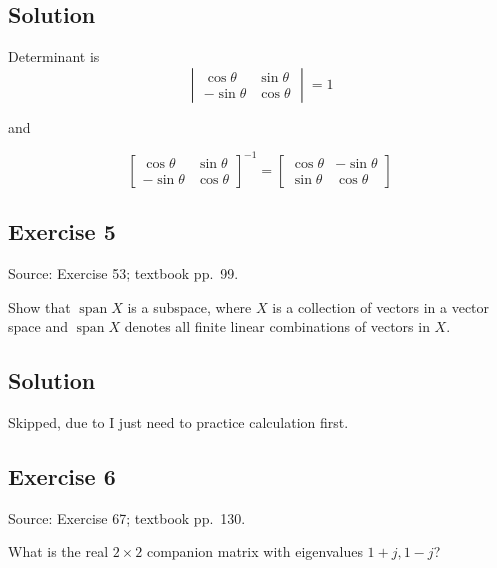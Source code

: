 \documentclass[12pt,a4paper]{article}
\newlength{\questionroom}
\newenvironment{questionprompt}{%
  \begin{lrbox}{\questionbox}\begin{minipage}{\linewidth}%
}{%
  \end{minipage}\end{lrbox}%
  \setlength{\questionroom}{\dimexpr\ht\questionbox+\dp\questionbox+5.2cm\relax}%
  \ifdim\questionroom>\textheight\setlength{\questionroom}{\textheight}\fi
  \Needspace{\questionroom}%
  \noindent\usebox{\questionbox}\par
}
\begin{document}
\subsection*{Solution}

Determinant is 
\[
\begin{vmatrix}
	\cos \theta & \sin\theta\\-\sin\theta & \cos\theta
\end{vmatrix} = 1
\]

and

\[
\begin{bmatrix}\cos\theta&\sin\theta\\-\sin\theta&\cos\theta\end{bmatrix}^{-1} =\begin{bmatrix}\cos\theta&-\sin\theta\\ \sin\theta&\cos\theta\end{bmatrix}
\]

\vspace{3.5cm}


\begin{questionprompt}
\section*{Exercise 5}
\label{practice:5}
{\small Source: Exercise 53; textbook pp.~99.}\par
Show that $\operatorname{span}X$ is a subspace, where $X$ is a collection of vectors in a vector space and $\operatorname{span}X$ denotes all finite linear combinations of vectors in $X$.
\end{questionprompt}
\subsection*{Solution}

Skipped, due to I just need to practice calculation first.

\vspace{3.5cm}


\begin{questionprompt}
\section*{Exercise 6}
\label{practice:6}
{\small Source: Exercise 67; textbook pp.~130.}\par
What is the real $2\times2$ companion matrix with eigenvalues $1+j,1-j$?
\end{questionprompt}
\end{document}
